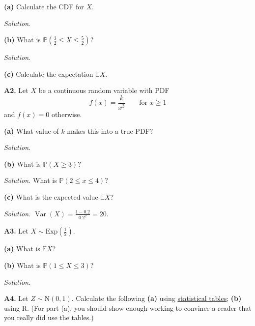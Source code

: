 \documentclass[
  a4paper,
]{book}
\theoremstyle{definition}
\theoremstyle{definition}
\theoremstyle{definition}
\theoremstyle{definition}
\theoremstyle{remark}
\begin{document}
\textbf{(a)} Calculate the CDF for \(X\).

\begin{myanswers}
\emph{Solution.}

\end{myanswers}

\textbf{(b)} What is \(\mathbb P(\tfrac32 \leq X \leq \tfrac52)\)?

\begin{myanswers}
\emph{Solution.}

\end{myanswers}

\textbf{(c)} Calculate the expectation \(\mathbb EX\).

\textbf{A2.} Let \(X\) be a continuous random variable with PDF
\[ f(x) = \frac{k}{x^3} \qquad \text{for $x \geq 1$} \]
and \(f(x) = 0\) otherwise.

\textbf{(a)} What value of \(k\) makes this into a true PDF?

\begin{myanswers}
\emph{Solution.}

\end{myanswers}

\textbf{(b)} What is \(\mathbb P(X \geq 3)\)?

\begin{myanswers}
\emph{Solution.} What is \(\mathbb P(2 \leq x \leq 4)\)?

\end{myanswers}

\textbf{(c)} What is the expected value \(\mathbb EX\)?

\begin{myanswers}
\emph{Solution.} \({\displaystyle \operatorname{Var}(X) = \frac{1 - 0.2}{0.2^2} = 20}\).

\end{myanswers}

\textbf{A3.} Let \(X \sim \text{Exp}(\frac12)\).

\textbf{(a)} What is \(\mathbb EX\)?

\textbf{(b)} What is \(\mathbb P(1 \leq X \leq 3)\)?

\begin{myanswers}
\emph{Solution.}

\end{myanswers}

\textbf{A4.} Let \(Z \sim \mathrm{N}(0,1)\). Calculate the following \textbf{(a)} using \href{https://mpaldridge.github.io/math1710/stat-tab.pdf}{statistical tables}; \textbf{(b)} using R. (For part (a), you should show enough working to convince a reader that you really did use the tables.)
\end{document}
